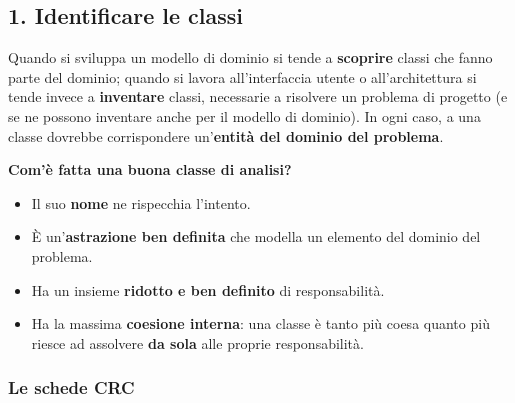 \subsection{1. Identificare le classi}

Quando si sviluppa un modello di dominio si tende a \textbf{scoprire} classi che fanno parte del dominio; quando si lavora
all'interfaccia utente o all'architettura si tende invece a \textbf{inventare} classi, necessarie a risolvere un problema di
progetto (e se ne possono inventare anche per il modello di dominio). In ogni caso, a una classe dovrebbe corrispondere
un'\textbf{entità del dominio del problema}.

\textbf{Com'è fatta una buona classe di analisi?}
\begin{itemize}
  \item Il suo \textbf{nome} ne rispecchia l'intento.
  \item È un'\textbf{astrazione ben definita} che modella un elemento del dominio del problema.
  \item Ha un insieme \textbf{ridotto e ben definito} di responsabilità.
  \item Ha la massima \textbf{coesione interna}: una classe è tanto più coesa quanto più riesce ad assolvere \textbf{da sola} alle
        proprie responsabilità.
\end{itemize}


\subsubsection*{Le schede CRC}

